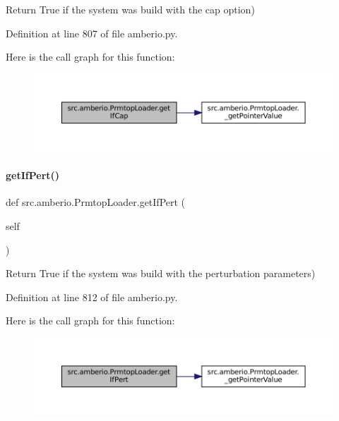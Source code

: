 Return True if the system was build with the cap option) 



Definition at line 807 of file amberio.\+py.

Here is the call graph for this function\+:
\nopagebreak
\begin{figure}[H]
\begin{center}
\leavevmode
\includegraphics[width=350pt]{classsrc_1_1amberio_1_1PrmtopLoader_aa6d06c4f57b4eb15a5d0b82c616aab96_cgraph}
\end{center}
\end{figure}
\mbox{\label{classsrc_1_1amberio_1_1PrmtopLoader_a3273e9dae8c7ed212344f9a76f05e473}} 
\paragraph{\texorpdfstring{get\+If\+Pert()}{getIfPert()}}
{\footnotesize\ttfamily def src.\+amberio.\+Prmtop\+Loader.\+get\+If\+Pert (\begin{DoxyParamCaption}\item[{}]{self }\end{DoxyParamCaption})}



Return True if the system was build with the perturbation parameters) 



Definition at line 812 of file amberio.\+py.

Here is the call graph for this function\+:
\nopagebreak
\begin{figure}[H]
\begin{center}
\leavevmode
\includegraphics[width=350pt]{classsrc_1_1amberio_1_1PrmtopLoader_a3273e9dae8c7ed212344f9a76f05e473_cgraph}
\end{center}
\end{figure}
\mbox{\label{classsrc_1_1amberio_1_1PrmtopLoader_a5692d84029e2fd6395a6438b1ae20437}} 
